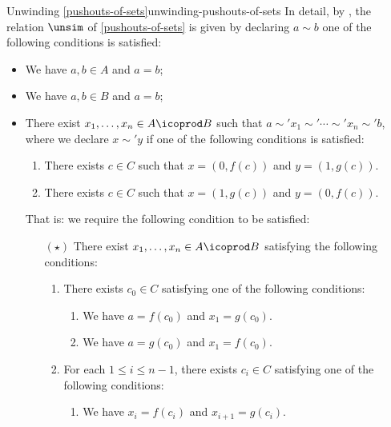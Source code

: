 \begin{remark}{Unwinding \cref{pushouts-of-sets}}{unwinding-pushouts-of-sets}%
    In detail, by , the relation $\unsim$ of \cref{pushouts-of-sets} is given by declaring $a\sim b$ \textiff one of the following conditions is satisfied:%
    \begin{itemize}
        \item We have $a,b\in A$ and $a=b$;
        \item We have $a,b\in B$ and $a=b$;
        \item There exist $x_{1},\ldots,x_{n}\in A\icoprod B$ such that $a\sim'x_{1}\sim'\cdots\sim'x_{n}\sim'b$, where we declare $x\sim'y$ if one of the following conditions is satisfied:
            \begin{enumerate}
                \item There exists $c\in C$ such that $x=(0,f(c))$ and $y=(1,g(c))$.
                \item There exists $c\in C$ such that $x=(1,g(c))$ and $y=(0,f(c))$.
            \end{enumerate}
            That is: we require the following condition to be satisfied:
            \begin{itemize}
                \item[$(\star)$]There exist $x_{1},\ldots,x_{n}\in A\icoprod B$ satisfying the following conditions:
                    \begin{enumerate}
                        \item There exists $c_{0}\in C$ satisfying one of the following conditions:
                            \begin{enumerate}
                                \item We have $a=f(c_{0})$ and $x_{1}=g(c_{0})$.
                                \item We have $a=g(c_{0})$ and $x_{1}=f(c_{0})$.
                            \end{enumerate}
                        \item For each $1\leq i\leq n-1$, there exists $c_{i}\in C$ satisfying one of the following conditions:
                            \begin{enumerate}
                                \item We have $x_{i}=f(c_{i})$ and $x_{i+1}=g(c_{i})$.

\end{enumerate}
\end{enumerate}
\end{itemize}
\end{itemize}
\end{remark}
